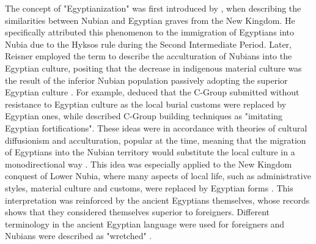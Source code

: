 The concept of "Egyptianization" was first introduced by \textcite{reisnerArchaeologicalSurveyNubia1910}, when describing the similarities between Nubian and Egyptian graves from the New Kingdom. He specifically attributed this phenomenon to the immigration of Egyptians into Nubia due to the Hyksos rule during the Second Intermediate Period. Later, Reisner employed the term to describe the acculturation of Nubians into the Egyptian culture, positing that the decrease in indigenous material culture was the result of the inferior Nubian population passively adopting the superior Egyptian culture \parencites[p.~236-237]{reisnerOutlineHistorySudan1918}{vanpeltRevisingEgyptoNubianRelations2013}\parencite{weglarzContinuityChangeReevaluation2017}. For example, \textcite{bietakStudienZurChronologie1968} deduced that the C-Group submitted without resistance to Egyptian culture as the local burial customs were replaced by Egyptian ones, while \textcite[p.~10]{säve-söderberghScandinavianJointExpedition1989} described C-Group building techniques as "imitating Egyptian fortifications". These ideas were in accordance with theories of cultural diffusionism and acculturation, popular at the time, meaning that the migration of Egyptians into the Nubian territory would substitute the local culture in a monodirectional way \parencites{raueIntroduction2019}. This idea was especially applied to the New Kingdom conquest of Lower Nubia, where many aspects of local life, such as administrative styles, material culture and customs, were replaced by Egyptian forms \parencites[p.~523]{vanpeltRevisingEgyptoNubianRelations2013}. This interpretation was reinforced by the ancient Egyptians themselves, whose records shows that they considered themselves superior to foreigners. Different terminology in the ancient Egyptian language were used for foreigners and Nubians were described as "wretched" \parencites[p.~12-13]{smithWretchedKushEthnic2003}.


